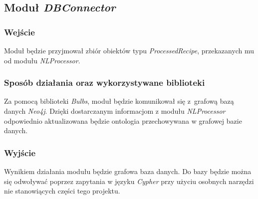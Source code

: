 \documentclass[11pt,a4paper]{article}
\begin{document}
\subsection{Moduł \textit{DBConnector}}
\subsubsection{Wejście}
Moduł będzie przyjmował zbiór obiektów typu \textit{ProcessedRecipe}, przekazanych mu od modułu \textit{NLProcessor}.
\subsubsection{Sposób działania oraz wykorzystywane biblioteki}
Za pomocą biblioteki \textit{Bulbs}, moduł będzie komunikował się z~grafową bazą danych \textit{Neo4j}. Dzięki dostarczanym informacjom z modułu \textit{NLProcessor } odpowiednio aktualizowana będzie ontologia przechowywana w grafowej bazie danych. 
\subsubsection{Wyjście}
Wynikiem działania modułu będzie grafowa baza danych. Do bazy będzie można się odwoływać poprzez zapytania w języku \textit{Cypher} przy użyciu osobnych narzędzi nie stanowiących części tego projektu.


%
\end{document}
